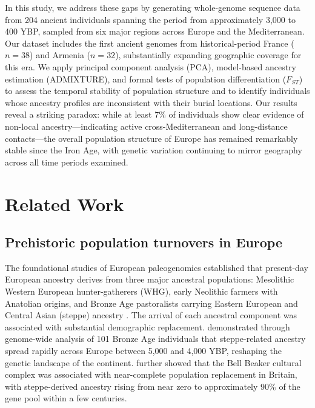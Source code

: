 \documentclass[11pt,a4paper]{article}
\begin{document}
In this study, we address these gaps by generating whole-genome sequence data from 204 ancient individuals spanning the period from approximately 3,000 to 400 YBP, sampled from six major regions across Europe and the Mediterranean. Our dataset includes the first ancient genomes from historical-period France ($n = 38$) and Armenia ($n = 32$), substantially expanding geographic coverage for this era. We apply principal component analysis (PCA), model-based ancestry estimation (ADMIXTURE), and formal tests of population differentiation ($F_{ST}$) to assess the temporal stability of population structure and to identify individuals whose ancestry profiles are inconsistent with their burial locations. Our results reveal a striking paradox: while at least 7\% of individuals show clear evidence of non-local ancestry---indicating active cross-Mediterranean and long-distance contacts---the overall population structure of Europe has remained remarkably stable since the Iron Age, with genetic variation continuing to mirror geography across all time periods examined.

\section{Related Work}

\subsection{Prehistoric population turnovers in Europe}
The foundational studies of European paleogenomics established that present-day European ancestry derives from three major ancestral populations: Mesolithic Western European hunter-gatherers (WHG), early Neolithic farmers with Anatolian origins, and Bronze Age pastoralists carrying Eastern European and Central Asian (steppe) ancestry \citep{lazaridis2014ancient, haak2015massive}. The arrival of each ancestral component was associated with substantial demographic replacement. \citet{allentoft2015population} demonstrated through genome-wide analysis of 101 Bronze Age individuals that steppe-related ancestry spread rapidly across Europe between 5,000 and 4,000 YBP, reshaping the genetic landscape of the continent. \citet{olalde2018beaker} further showed that the Bell Beaker cultural complex was associated with near-complete population replacement in Britain, with steppe-derived ancestry rising from near zero to approximately 90\% of the gene pool within a few centuries.
\end{document}
